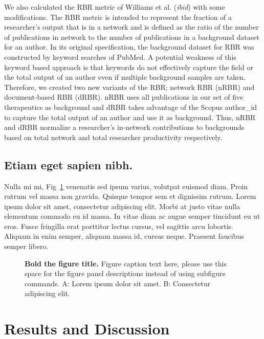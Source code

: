 \documentclass[10pt,letterpaper]{article}
\begin{document}
We also calculated the RBR metric of Williams et al. (\textit{ibid}) with some modifications. The RBR metric is intended to represent the fraction of a researcher's output that is in a network and is defined as the ratio of the number of publications in network to the number of publications in a background dataset for an author. In its original specification, the background dataset for RBR was constructed by keyword searches of PubMed. A potential weakness of this keyword based approach is that keywords do not effectively capture the field or the total output of an author even if multiple background samples are taken. Therefore, we created two new variants of the RBR; network RBR (nRBR) and document-based RBR (dRBR). nRBR uses all publications in our set of five therapeutics as background and dRBR takes advantage of the Scopus author\_id to capture the total output of an author and use it as background. Thus, nRBR and dRBR normalize a researcher's in-network contributions to backgrounds based on total network and total researcher productivity respectively.

\subsection*{Etiam eget sapien nibh.}

Nulla mi mi, Fig~\ref{fig1} venenatis sed ipsum varius, volutpat euismod diam. Proin rutrum vel massa non gravida. Quisque tempor sem et dignissim rutrum. Lorem ipsum dolor sit amet, consectetur adipiscing elit. Morbi at justo vitae nulla elementum commodo eu id massa. In vitae diam ac augue semper tincidunt eu ut eros. Fusce fringilla erat porttitor lectus cursus,  vel sagittis arcu lobortis. Aliquam in enim semper, aliquam massa id, cursus neque. Praesent faucibus semper libero.

\begin{figure}[!h]
\caption{{\bf Bold the figure title.}
Figure caption text here, please use this space for the figure panel descriptions instead of using subfigure commands. A: Lorem ipsum dolor sit amet. B: Consectetur adipiscing elit.}
\label{fig1}
\end{figure}

\section*{Results and Discussion}
\end{document}
